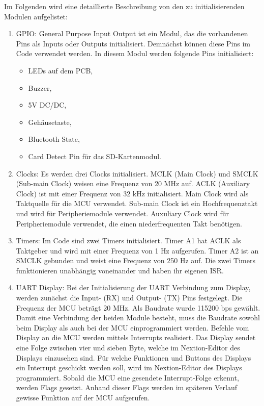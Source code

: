 Im Folgenden wird eine detaillierte Beschreibung von den zu initialisierenden Modulen aufgelistet:
\begin{enumerate}
    \item GPIO: General Purpose Input Output ist ein Modul, das die vorhandenen Pins als Inputs oder Outputs initialisiert. Demnächst können diese Pins im Code verwendet werden. In diesem Modul werden folgende Pins initialisiert:
    \begin{itemize}
        \item LEDs auf dem PCB,
        \item Buzzer,
        \item 5V DC/DC,
        \item Gehäusetaste,
        \item Bluetooth State,
        \item Card Detect Pin für das SD-Kartenmodul.
    \end{itemize}
    \item Clocks: Es werden drei Clocks initialisiert. MCLK (Main Clock) und SMCLK (Sub-main Clock) weisen eine Frequenz von 20 MHz auf. ACLK (Auxiliary Clock) ist mit einer Frequenz von 32 kHz initialisiert.
    Main Clock wird als Taktquelle für die MCU verwendet. Sub-main Clock ist ein Hochfrequenztakt und wird für Peripheriemodule verwendet. Auxuliary Clock wird für Peripheriemodule verwendet, die einen niederfrequenten Takt benötigen.
    \item Timers: Im Code sind zwei Timers initialisiert. Timer A1 hat ACLK als Taktgeber und wird mit einer Frequenz von 1 Hz aufgerufen. Timer A2 ist an SMCLK gebunden und weist eine Frequenz von 250 Hz auf. Die zwei Timers funktionieren unabhängig voneinander und haben ihr eigenen ISR.
    \item UART Display: Bei der Initialisierung der UART Verbindung zum Display, werden zunächst die Input- (RX) und Output- (TX) Pins festgelegt. Die Frequenz der MCU beträgt 20 MHz. Als Baudrate wurde 115200 bps gewählt. Damit eine Verbindung der beiden Module besteht, muss die Baudrate sowohl beim Display als auch bei der MCU einprogrammiert werden. 
    Befehle vom Display an die MCU werden mittels Interrupts realisiert. Das Display sendet eine Folge zwischen vier und sieben Byte, welche im Nextion-Editor des Displays einzusehen sind. Für welche Funktionen und Buttons des Displays ein Interrupt geschickt werden soll, wird im Nextion-Editor des Displays programmiert. Sobald die MCU eine gesendete Interrupt-Folge erkennt, werden Flags gesetzt. Anhand dieser Flags werden im späteren Verlauf gewisse Funktion auf der MCU aufgerufen.

\end{enumerate}
